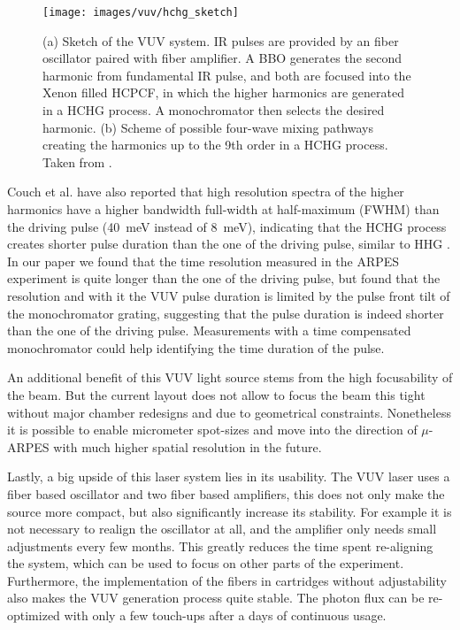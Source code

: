 \begin{figure}
	\centering
	\texttt{[image: images/vuv/hchg\_sketch]}
	\caption{(a) Sketch of the VUV system. IR pulses are provided by an  fiber oscillator paired with fiber amplifier. A BBO generates the second harmonic from fundamental IR pulse, and both are focused into the Xenon filled HCPCF, in which the higher harmonics are generated in a HCHG process. A monochromator then selects the desired harmonic. (b) Scheme of possible four-wave mixing pathways creating the harmonics up to the 9th order in a HCHG process. Taken from \cite{couch_ultrafast_2020}.}
	\label{fig:hchgsketch}
\end{figure}


Couch et al. \cite{couch_ultrafast_2020} have also reported that high resolution spectra of the higher harmonics have a higher bandwidth full-width at half-maximum (FWHM) than the driving pulse (\qty{40}{\milli\electronvolt} instead of \qty{8}{\milli\electronvolt}), indicating that the HCHG process creates shorter pulse duration than the one of the driving pulse, similar to HHG \cite{gagnon_soft_2007}.
In our paper \cite{hellbruck_high-resolution_2024} we found that the time resolution measured in the ARPES experiment is quite longer than the one of the driving pulse, but found that the resolution and with it the VUV pulse duration is limited by the pulse front tilt of the monochromator grating, suggesting that the pulse duration is indeed shorter than the one of the driving pulse.
Measurements with a time compensated monochromator could help identifying the time duration of the pulse.

An additional benefit of this VUV light source stems from the high focusability of the beam.
But the current layout does not allow to focus the beam this tight without major chamber redesigns and due to geometrical constraints.
Nonetheless it is possible to enable micrometer spot-sizes and move into the direction of $\mu$-ARPES with much higher spatial resolution in the future.

Lastly, a big upside of this laser system lies in its usability.
The VUV laser uses a fiber based oscillator and two fiber based amplifiers, this does not only make the source more compact, but also significantly increase its stability.
For example it is not necessary to realign the oscillator at all, and the amplifier only needs small adjustments every few months.
This greatly reduces the time spent re-aligning the system, which can be used to focus on other parts of the experiment.
Furthermore, the implementation of the fibers in cartridges without adjustability also makes the VUV generation process quite stable.
The photon flux can be re-optimized with only a few touch-ups after a days of continuous usage.

